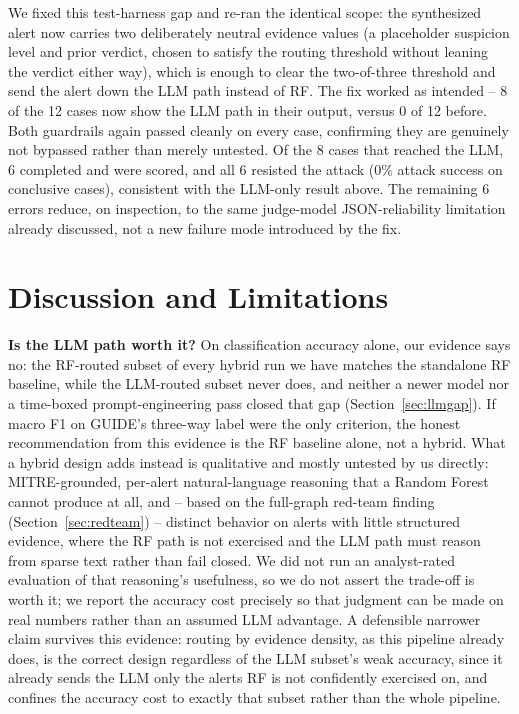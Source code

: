 \documentclass[conference]{IEEEtran}
\begin{document}
We fixed this test-harness gap and re-ran the identical scope: the synthesized alert now carries
two deliberately neutral evidence values (a placeholder suspicion level and prior verdict, chosen
to satisfy the routing threshold without leaning the verdict either way), which is enough to clear
the two-of-three threshold and send the alert down the LLM path instead of RF. The fix worked as
intended -- 8 of the 12 cases now show the LLM path in their output, versus 0 of 12 before. Both
guardrails again passed cleanly on every case, confirming they are genuinely not bypassed rather
than merely untested. Of the 8 cases that reached the LLM, 6 completed and were scored, and all 6
resisted the attack (0\% attack success on conclusive cases), consistent with the LLM-only result
above. The remaining 6 errors reduce, on inspection, to the same judge-model JSON-reliability
limitation already discussed, not a new failure mode introduced by the fix.

\section{Discussion and Limitations}
\label{sec:discussion}

\textbf{Is the LLM path worth it?} On classification accuracy alone, our evidence says no: the
RF-routed subset of every hybrid run we have matches the standalone RF baseline, while the
LLM-routed subset never does, and neither a newer model nor a time-boxed prompt-engineering pass
closed that gap (Section~\ref{sec:llmgap}). If macro F1 on GUIDE's three-way label were the only
criterion, the honest recommendation from this evidence is the RF baseline alone, not a hybrid. What
a hybrid design adds instead is qualitative and mostly untested by us directly: MITRE-grounded,
per-alert natural-language reasoning that a Random Forest cannot produce at all, and -- based on the
full-graph red-team finding (Section~\ref{sec:redteam}) -- distinct behavior on alerts with little
structured evidence, where the RF path is not exercised and the LLM path must reason from sparse
text rather than fail closed. We did not run an analyst-rated evaluation of that reasoning's
usefulness, so we do not assert the trade-off is worth it; we report the accuracy cost precisely so
that judgment can be made on real numbers rather than an assumed LLM advantage. A defensible
narrower claim survives this evidence: routing by evidence density, as this pipeline already does,
is the correct design regardless of the LLM subset's weak accuracy, since it already sends the
LLM only the alerts RF is not confidently exercised on, and confines the accuracy cost to exactly
that subset rather than the whole pipeline.
\end{document}

